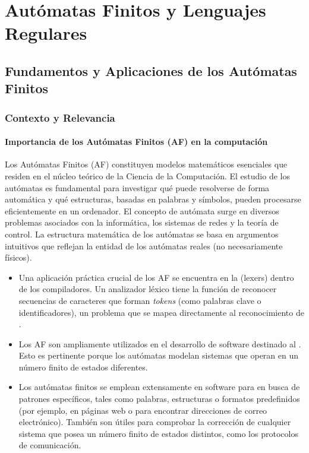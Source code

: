 \chapter{Autómatas Finitos y Lenguajes Regulares}

\section{Fundamentos y Aplicaciones de los Autómatas Finitos}

\subsection{Contexto y Relevancia}

\subsubsection{Importancia de los Autómatas Finitos (AF) en la computación}

Los Autómatas Finitos (AF) constituyen modelos matemáticos esenciales que residen en el núcleo teórico de la Ciencia de la Computación. El estudio de los autómatas es fundamental para investigar qué puede resolverse de forma automática y qué estructuras, basadas en palabras y símbolos, pueden procesarse eficientemente en un ordenador. El concepto de autómata surge en diversos problemas asociados con la informática, los sistemas de redes y la teoría de control. La estructura matemática de los autómatas se basa en argumentos intuitivos que reflejan la entidad de los autómatas reales (no necesariamente físicos).

\begin{itemize}
    \item {}
    Una aplicación práctica crucial de los AF se encuentra en la  (lexers) dentro de los compiladores. Un analizador léxico tiene la función de reconocer secuencias de caracteres que forman \textit{tokens} (como palabras clave o identificadores), un problema que se mapea directamente al reconocimiento de .

    \item {}
    Los AF son ampliamente utilizados en el desarrollo de software destinado al . Esto es pertinente porque los autómatas modelan sistemas que operan en un número finito de estados diferentes.

    \item {}
    Los autómatas finitos se emplean extensamente en software para  en busca de patrones específicos, tales como palabras, estructuras o formatos predefinidos (por ejemplo, en páginas web o para encontrar direcciones de correo electrónico). También son útiles para comprobar la corrección de cualquier sistema que posea un número finito de estados distintos, como los protocolos de comunicación.
\end{itemize}

